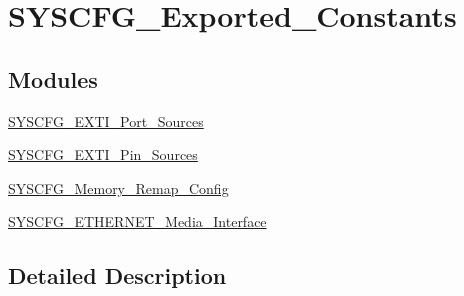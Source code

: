 \hypertarget{group___s_y_s_c_f_g___exported___constants}{\section{S\-Y\-S\-C\-F\-G\-\_\-\-Exported\-\_\-\-Constants}
\label{group___s_y_s_c_f_g___exported___constants}
}
\subsection*{Modules}
\begin{DoxyCompactItemize}
\item 
\hyperlink{group___s_y_s_c_f_g___e_x_t_i___port___sources}{S\-Y\-S\-C\-F\-G\-\_\-\-E\-X\-T\-I\-\_\-\-Port\-\_\-\-Sources}
\item 
\hyperlink{group___s_y_s_c_f_g___e_x_t_i___pin___sources}{S\-Y\-S\-C\-F\-G\-\_\-\-E\-X\-T\-I\-\_\-\-Pin\-\_\-\-Sources}
\item 
\hyperlink{group___s_y_s_c_f_g___memory___remap___config}{S\-Y\-S\-C\-F\-G\-\_\-\-Memory\-\_\-\-Remap\-\_\-\-Config}
\item 
\hyperlink{group___s_y_s_c_f_g___e_t_h_e_r_n_e_t___media___interface}{S\-Y\-S\-C\-F\-G\-\_\-\-E\-T\-H\-E\-R\-N\-E\-T\-\_\-\-Media\-\_\-\-Interface}
\end{DoxyCompactItemize}


\subsection{Detailed Description}
